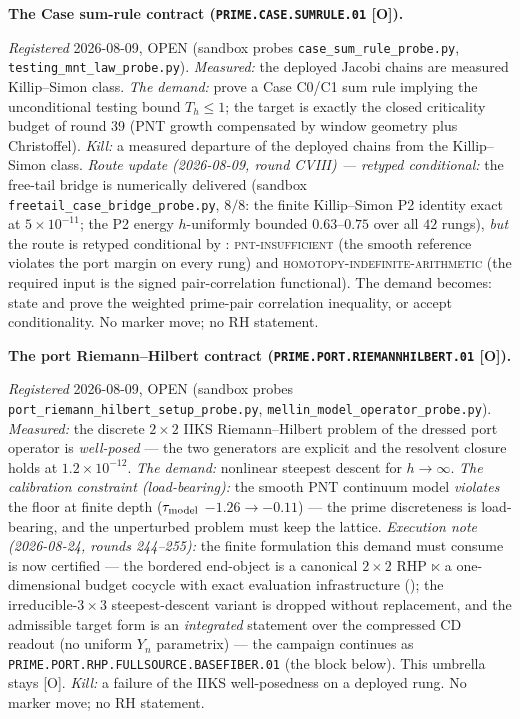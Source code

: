 \par\smallskip\noindent\textbf{The Case sum-rule contract
(\texttt{PRIME.CASE.\allowbreak SUMRULE.01} [O]).}
{\sloppy
\emph{Registered} 2026-08-09, OPEN (sandbox probes
\texttt{case\_sum\_rule\_probe.py},
\texttt{testing\_mnt\_law\_probe.py}).  \emph{Measured:} the
deployed Jacobi chains are measured Killip--Simon class.
\emph{The demand:} prove a Case C0/C1 sum rule implying the
unconditional testing bound $T_h \le 1$; the target is exactly
the closed criticality budget of round 39 (PNT growth compensated
by window geometry plus Christoffel).  \emph{Kill:} a measured
departure of the deployed chains from the Killip--Simon class.
\emph{Route update (2026-08-09, round CVIII) --- retyped
conditional:} the free-tail bridge is numerically delivered
(sandbox \texttt{freetail\_case\_bridge\_probe.py}, $8/8$: the
finite Killip--Simon P2 identity exact at $5\times10^{-11}$; the
P2 energy $h$-uniformly bounded $0.63$--$0.75$ over all $42$
rungs), \emph{but} the route is retyped conditional by
: \textsc{pnt-insufficient} (the
smooth reference violates the port margin on every rung) and
\textsc{homotopy-indefinite-arithmetic} (the required input is
the signed pair-correlation functional).  The demand becomes:
state and prove the weighted prime-pair correlation inequality,
or accept conditionality.  No marker move; no RH
statement.\par}


\par\smallskip\noindent\textbf{The port Riemann--Hilbert contract
(\texttt{PRIME.PORT.\allowbreak RIEMANNHILBERT.01} [O]).}
{\sloppy
\emph{Registered} 2026-08-09, OPEN (sandbox probes
\texttt{port\_riemann\_hilbert\_setup\_probe.py},
\texttt{mellin\_model\_operator\_probe.py}).  \emph{Measured:}
the discrete $2\times2$ IIKS Riemann--Hilbert problem of the
dressed port operator is \emph{well-posed} --- the two generators
are explicit and the resolvent closure holds at
$1.2\times10^{-12}$.  \emph{The demand:} nonlinear steepest
descent for $h \to \infty$.  \emph{The calibration constraint
(load-bearing):} the smooth PNT continuum model \emph{violates}
the floor at finite depth ($\tau_{\rm model}$ $-1.26 \to -0.11$)
--- the prime discreteness is load-bearing, and the unperturbed
problem must keep the lattice.  \emph{Execution note (2026-08-24, rounds 244--255):} the
finite formulation this demand must consume is now certified
--- the bordered end-object is a canonical $2\times2$ RHP
$\ltimes$ a one-dimensional budget cocycle with exact
evaluation infrastructure
(); the
irreducible-$3\times3$ steepest-descent variant is dropped
without replacement, and the admissible target form is an
\emph{integrated} statement over the compressed CD readout
(no uniform $Y_n$ parametrix) --- the campaign continues as
\texttt{PRIME.PORT.RHP.FULLSOURCE.\allowbreak BASEFIBER.01}
(the block below).  This umbrella stays [O].  \emph{Kill:} a
failure of the
IIKS well-posedness on a deployed rung.  No marker move; no RH
statement.\par}


